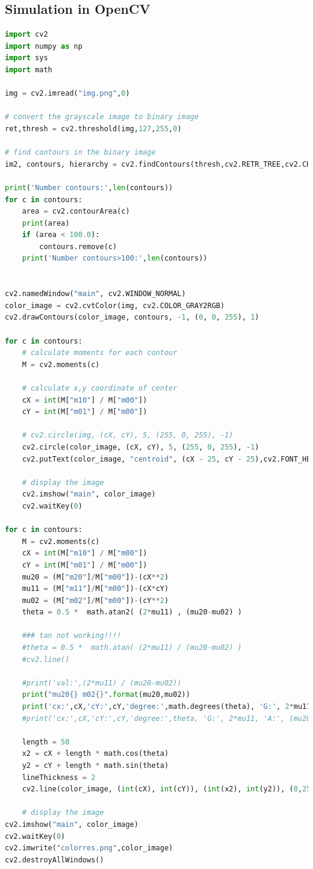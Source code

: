 \documentclass[a4paper]{report}
\begin{document}
\subsection{Simulation in OpenCV}

\begin{lstlisting}[language=Python, caption=Simulation in OpenCV]      
import cv2
import numpy as np 
import sys
import math

img = cv2.imread("img.png",0)

# convert the grayscale image to binary image
ret,thresh = cv2.threshold(img,127,255,0)
 
# find contours in the binary image
im2, contours, hierarchy = cv2.findContours(thresh,cv2.RETR_TREE,cv2.CHAIN_APPROX_SIMPLE)

print('Number contours:',len(contours))
for c in contours:
    area = cv2.contourArea(c)
    print(area)
	if (area < 100.0):
		contours.remove(c)
	print('Number contours>100:',len(contours))


cv2.namedWindow("main", cv2.WINDOW_NORMAL)
color_image = cv2.cvtColor(img, cv2.COLOR_GRAY2RGB)
cv2.drawContours(color_image, contours, -1, (0, 0, 255), 1) 

for c in contours:
    # calculate moments for each contour
    M = cv2.moments(c)

    # calculate x,y coordinate of center
    cX = int(M["m10"] / M["m00"])
    cY = int(M["m01"] / M["m00"])
   
    # cv2.circle(img, (cX, cY), 5, (255, 0, 255), -1)
    cv2.circle(color_image, (cX, cY), 5, (255, 0, 255), -1)
    cv2.putText(color_image, "centroid", (cX - 25, cY - 25),cv2.FONT_HERSHEY_SIMPLEX, 0.5, (255, 0, 255), 2)

    # display the image
    cv2.imshow("main", color_image)
    cv2.waitKey(0)
    
for c in contours:
    M = cv2.moments(c)
    cX = int(M["m10"] / M["m00"])
    cY = int(M["m01"] / M["m00"])
    mu20 = (M["m20"]/M["m00"])-(cX**2)
    mu11 = (M["m11"]/M["m00"])-(cX*cY)
    mu02 = (M["m02"]/M["m00"])-(cY**2)
    theta = 0.5 *  math.atan2( (2*mu11) , (mu20-mu02) )
   
    ### tan not working!!!!
    #theta = 0.5 *  math.atan( (2*mu11) / (mu20-mu02) )
    #cv2.line()
    
    #print('val:',(2*mu11) / (mu20-mu02))
    print("mu20{} m02{}".format(mu20,mu02))
    print('cx:',cX,'cY:',cY,'degree:',math.degrees(theta), 'G:', 2*mu11, 'A:', (mu20-mu02))
    #print('cx:',cX,'cY:',cY,'degree:',theta, 'G:', 2*mu11, 'A:', (mu20-mu02))
    
    length = 50
    x2 = cX + length * math.cos(theta)
    y2 = cY + length * math.sin(theta) 
    lineThickness = 2
    cv2.line(color_image, (int(cX), int(cY)), (int(x2), int(y2)), (0,255,0), lineThickness)
    
    # display the image
cv2.imshow("main", color_image)
cv2.waitKey(0)    
cv2.imwrite("colorres.png",color_image)
cv2.destroyAllWindows()

\end{lstlisting}
\end{document}
